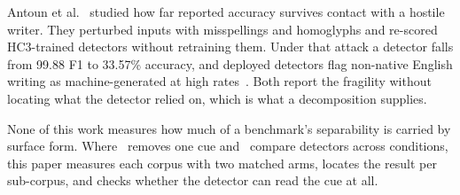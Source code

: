 Antoun et al.~\cite{Antoun2023towards} studied how far reported accuracy survives contact with a hostile writer. They perturbed inputs with misspellings and homoglyphs and re-scored HC3-trained detectors without retraining them. Under that attack a detector falls from 99.88 F1 to 33.57\% accuracy, and deployed detectors flag non-native English writing as machine-generated at high rates~\cite{Liang2023gpt}. Both report the fragility without locating what the detector relied on, which is what a decomposition supplies.

None of this work measures how much of a benchmark's separability is carried by surface form. Where~\cite{Tian2023multiscale} removes one cue and~\cite{Dugan2024raid,Wang2024m4} compare detectors across conditions, this paper measures each corpus with two matched arms, locates the result per sub-corpus, and checks whether the detector can read the cue at all.
